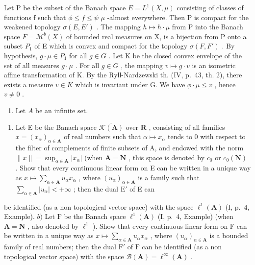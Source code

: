 Let P be the subset of the Banach space \(E = L^{1}(X, \mu)\) consisting of classes of functions f such that \(\phi \leqslant f \leqslant \psi\) \(\mu\) -almost everywhere. Then P is compact for the weakened topology \(\sigma(E, E')\) . The mapping \(h \mapsto h \cdot \mu\) from P into the Banach space \(F = \mathcal{M}^{b}(X)\) of bounded real measures on X, is a bijection from P onto a subset \(P_{1}\) of E which is convex and compact for the topology \(\sigma(F, F')\) . By hypothesis, \(g \cdot \mu \in P_{1}\) for all \(g \in G\) . Let K be the closed convex envelope of the set of all measures \(g \cdot \mu\) . For all \(g \in G\) , the mapping \(v \mapsto g \cdot v\) is an isometric affine transformation of K. By the Ryll-Nardzewski th. (IV, p.~43, th. 2), there exists a measure \(v \in K\) which is invariant under G. We have \(\phi \cdot \mu \leqslant v\) , hence \(v \neq 0\) .

\closechapterappendix
\exercisesheading

\exercisegroup

\begin{enumerate}
\def\labelenumi{\arabic{enumi})}
\tightlist
\item
  Let \(A\) be an infinite set.
\end{enumerate}

\begin{enumerate}
\def\labelenumi{\alph{enumi})}
\tightlist
\item
  Let E be the Banach space \(\overline{\mathcal{K}(\mathbf{A})}\) over \(\mathbf{R}\) , consisting of all families \(x = (x_{\alpha})_{\alpha \in \mathbf{A}}\) of real numbers such that \(\alpha \mapsto x_{\alpha}\) tends to 0 with respect to the filter of complements of finite subsets of A, and endowed with the norm \(\| x\| = \sup_{\alpha \in \mathbf{A}}|x_{\alpha}|\) (when \(\mathbf{A} = \mathbf{N}\) , this space is denoted by \(c_0\) or \(c_0(\mathbf{N})\) . Show that every continuous linear form on E can be written in a unique way as \(x \mapsto \sum_{\alpha \in \mathbf{A}} u_{\alpha} x_{\alpha}\) , where \((u_{\alpha})_{\alpha \in \mathbf{A}}\) is a family such that \(\sum_{\alpha \in \mathbf{A}} |u_{\alpha}| < +\infty\) ; then the dual \(\mathrm{E}'\) of E can
\end{enumerate}

be identified (as a non topological vector space) with the space \(\ell^1 (\mathbf{A})\) (I, p.~4, Example). \(b)\) Let \(\mathrm{F}\) be the Banach space \(\ell^1 (\mathbf{A})\) (I, p.~4, Example) (when \(\mathbf{A} = \mathbf{N}\) , also denoted by \(\ell^1\) ). Show that every continuous linear form on \(\mathrm{F}\) can be written in a unique way as \(x\mapsto \sum_{\alpha \in \mathbf{A}}u_{\alpha}x_{\alpha}\) , where \((u_{\alpha})_{\alpha \in \mathbf{A}}\) is a bounded family of real numbers; then the dual \(\mathrm{F}'\) of \(\mathrm{F}\) can be identified (as a non topological vector space) with the space \(\mathcal{B}(\mathbf{A}) = \ell^{\infty}(\mathbf{A})\) .


